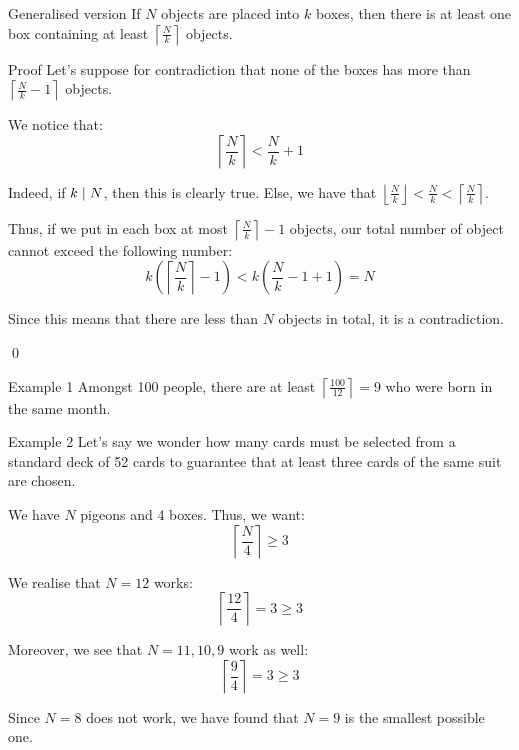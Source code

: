 \documentclass[a4paper]{article}
\begin{document}
\begin{parag}{Generalised version}
    If $N$ objects are placed into $k$ boxes, then there is at least one box containing at least $\left\lceil \frac{N}{k} \right\rceil $ objects.

    \begin{subparag}{Proof}
        Let's suppose for contradiction that none of the boxes has more than $\left\lceil \frac{N}{k} - 1 \right\rceil $ objects.

        We notice that: 
        \[\left\lceil \frac{N}{k} \right\rceil < \frac{N}{k} + 1\]
        
        Indeed, if $k \mid N$, then this is clearly true. Else, we have that $\left\lfloor \frac{N}{k} \right\rfloor < \frac{N}{k} < \left\lceil \frac{N}{k} \right\rceil $.

        Thus, if we put in each box at most $\left\lceil \frac{N}{k} \right\rceil - 1$ objects, our total number of object cannot exceed the following number: 
        \[k\left(\left\lceil \frac{N}{k} \right\rceil - 1\right) < k\left(\frac{N}{k} - 1 + 1\right) = N\]
        
        Since this means that there are less than $N$ objects in total, it is a contradiction.

        \qed
    \end{subparag}
    
\end{parag}

\begin{parag}{Example 1}
    Amongst 100 people, there are at least $\left\lceil \frac{100}{12} \right\rceil = 9$ who were born in the same month.
\end{parag}

\begin{parag}{Example 2}
    Let's say we wonder how many cards must be selected from a standard deck of 52 cards to guarantee that at least three cards of the same suit are chosen.

    We have $N$ pigeons and 4 boxes. Thus, we want: 
    \[\left\lceil \frac{N}{4} \right\rceil \geq 3\]
    
    We realise that $N = 12$ works: 
    \[\left\lceil \frac{12}{4} \right\rceil = 3 \geq 3\]
    
    Moreover, we see that $N = 11, 10, 9$ work as well: 
    \[\left\lceil \frac{9}{4} \right\rceil = 3 \geq 3\]
    
    Since $N = 8$ does not work, we have found that $N = 9$ is the smallest possible one.
\end{parag}
\end{document}
